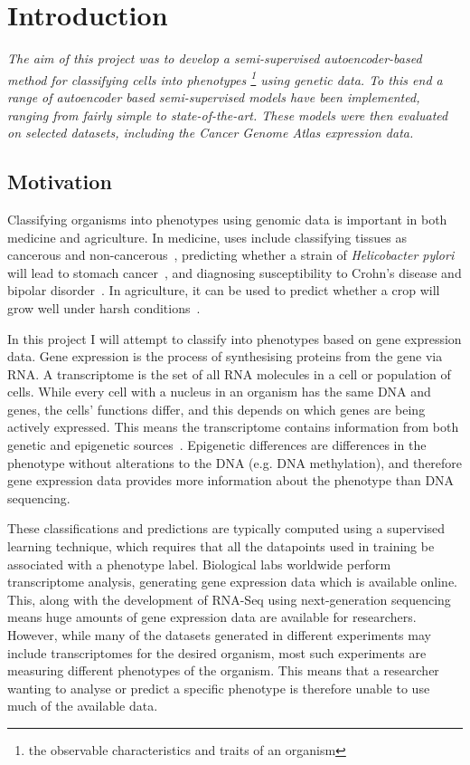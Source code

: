\chapter{Introduction}

\textit{The aim of this project was to develop a semi-supervised autoencoder-based method for classifying 
cells into phenotypes \footnote{the observable characteristics and traits of an organism} using genetic data. To this end a range 
of autoencoder based semi-supervised models have been implemented, 
ranging from fairly simple to state-of-the-art. These models were then evaluated on selected datasets, including 
the Cancer Genome Atlas expression data.}

\section{Motivation}

Classifying organisms into phenotypes using genomic data is important in both medicine and agriculture. In medicine, uses include 
classifying tissues as cancerous and non-cancerous~\cite{Li2017}, predicting whether a strain of \textit{Helicobacter pylori} will lead to 
stomach cancer~\cite{helicobacter}, and diagnosing susceptibility to Crohn's disease and bipolar disorder~\cite{doi:10.1002/humu.23280}.
In agriculture, it can be used to predict whether a crop will grow well under harsh conditions~\cite{cimmyt}.

In this project I will attempt to classify into phenotypes based on gene expression data. Gene expression is the process of synthesising 
proteins from the gene via RNA. A transcriptome is the set of all RNA 
molecules in a cell or population of cells. While every cell with a nucleus in an organism has the same DNA and genes, the cells'
functions differ, and this depends on which genes are being actively expressed. This means the
transcriptome contains information from both genetic and epigenetic sources~\cite{Gibney2010}. Epigenetic differences are differences
in the phenotype without alterations to the DNA (e.g. DNA methylation), and therefore gene expression data provides more information about 
the phenotype than DNA sequencing.

These classifications and predictions are typically computed using a supervised learning technique, which requires that all the 
datapoints used in training be associated with a phenotype label. Biological labs worldwide perform transcriptome analysis, 
generating gene expression data 
which is available online. This, along with the development
of RNA-Seq using next-generation sequencing means huge amounts of gene expression data are available for researchers. However,
while many of the datasets generated in different experiments may include transcriptomes for the desired organism,
most such experiments are measuring different phenotypes of the organism. This means that a 
researcher wanting to analyse or predict a specific phenotype is therefore unable to use much of the available data.

